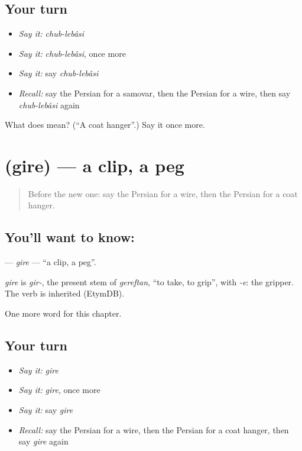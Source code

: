 \subsection*{Your turn}
\begin{itemize}
\raggedright
  \item \emph{Say it:} \emph{chub-lebâsi}
  \item \emph{Say it:} \emph{chub-lebâsi}, once more
  \item \emph{Say it:} say \emph{chub-lebâsi}
  \item \emph{Recall:} say the Persian for a samovar, then the Persian for a wire, then say \emph{chub-lebâsi} again
\end{itemize}

\begin{tcolorbox}[breakable,colback=teal!4,colframe=teal!35!black,title={Before you move on}]
What does   mean? (\textquotedblleft{}A coat hanger\textquotedblright{}.) Say it once more.
\end{tcolorbox}
\section[\texorpdfstring{\fa{گیره} (gire)}{گیره (gire)}]{ (gire) — a clip, a peg}

\label{lesson:FA-C248-gire}



\begin{quote}
Before the new one: say the Persian for a wire, then the Persian for a coat hanger.
\end{quote}

\subsection*{You'll want to know: }
\textbf{} — \emph{gire} — \textquotedblleft{}a clip, a peg\textquotedblright{}.

\begin{cousinweb}
\emph{gire} is \emph{gir-}, the present stem of \emph{gereftan}, \textquotedblleft{}to take, to grip\textquotedblright{}, with \emph{-e}: the gripper. The verb is inherited (EtymDB).
\end{cousinweb}

\begin{grammarlens}[title={What you've built}]
One more word for this chapter.
\end{grammarlens}

\subsection*{Your turn}
\begin{itemize}
\raggedright
  \item \emph{Say it:} \emph{gire}
  \item \emph{Say it:} \emph{gire}, once more
  \item \emph{Say it:} say \emph{gire}
  \item \emph{Recall:} say the Persian for a wire, then the Persian for a coat hanger, then say \emph{gire} again
\end{itemize}

